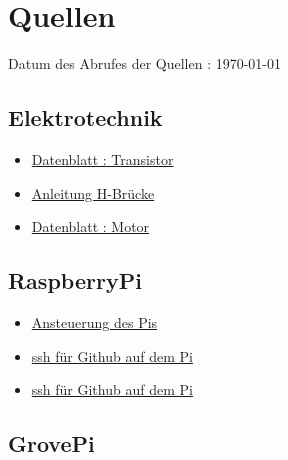 \documentclass[notitlepage]{report}
\begin{document}
\section{Quellen}

Datum des Abrufes der Quellen : \today

\subsection{Elektrotechnik}
\begin{itemize}

\item \href{http://cdn-reichelt.de/documents/datenblatt/A100/BC546_48-CDIL.pdf}{Datenblatt : Transistor}


\item \href{http://anleitung.joy-it.net/wp-content/uploads/2017/06/SBC-MotoDriver2-Anleitung.pdf}{Anleitung H-Br\"{u}cke}

\item \href{http://cdn-reichelt.de/documents/datenblatt/A300/COM_MOTOR_RAD_DB-DE.pdf}{Datenblatt : Motor}

\end{itemize}

\subsection{RaspberryPi}

\begin{itemize}

\item \href{http://www.netzmafia.de/skripten/hardware/RasPi/RasPi_GPIO_C.html}{Ansteuerung des Pis}

\item \href{https://help.github.com/enterprise/2.14/user/articles/generating-a-new-ssh-key-and-adding-it-to-the-ssh-agent/}{ssh f\"{u}r Github auf dem Pi}

\item \href{https://devmarketer.io/learn/set-ssh-key-github/}{ssh f\"{u}r Github auf dem Pi}

\end{itemize}

\subsection{GrovePi}
\end{document}
